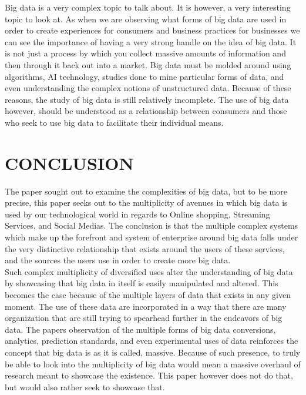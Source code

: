 \documentclass[sigconf]{acmart}
\begin{document}
Big data is a very complex topic to talk about. It is however, a very interesting topic to look at. As when we are observing what forms of big data are used in order to create experiences for consumers and business practices for businesses we can see the importance of having a very strong handle on the idea of big data. It is not just a process by which you collect massive amounts of information and then through it back out into a market. Big data must be molded around using algorithms, AI technology, studies done to mine particular forms of data, and even understanding the complex notions of unstructured data. Because of these reasons, the study of big data is still relatively incomplete. The use of big data however, should be understood as a relationship between consumers and those who seek to use big data to facilitate their individual means. 

\section{CONCLUSION}
The paper sought out to examine the complexities of big data, but to be more precise, this paper seeks out to the multiplicity of avenues in which big data is used by our technological world in regards to Online shopping, Streaming Services, and Social Medias. The conclusion is that the multiple complex systems which make up the forefront and system of enterprise around big data falls under the very distinctive relationship that exists around the users of these services, and the sources the users use in order to create more big data. \\ 

Such complex multiplicity of diversified uses alter the understanding of big data by showcasing that big data in itself is easily manipulated and altered. This becomes the case because of the multiple layers of data that exists in any given moment. The use of these data are incorporated in a way that there are many organization that are still trying to spearhead further in the endeavors of big data. The papers observation of the multiple forms of big data conversions, analytics, prediction standards, and even experimental uses of data reinforces the concept that big data is as it is called, massive. Because of such presence, to truly be able to look into the multiplicity of big data would mean a massive overhaul of research meant to showcase the existence. This paper however does not do that, but would also rather seek to showcase that.\\ 
\end{document}

